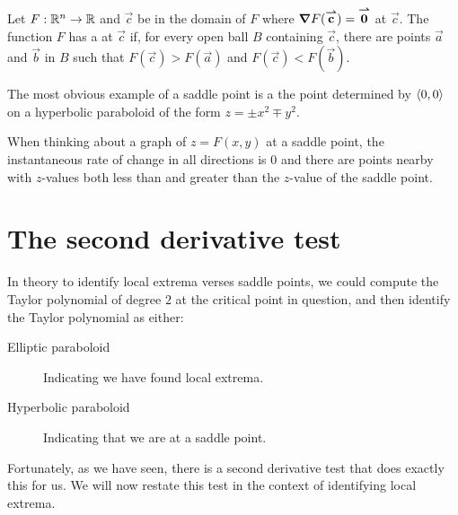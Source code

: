 \documentclass{ximera}
\begin{document}
\begin{definition}
  Let $F:\mathbb R^n\to\mathbb R$ and $\vec{c}$ be in the domain of $F$ where $\boldsymbol\nabla
  F({\overset{\boldsymbol{\rightharpoonup}}{\mathbf{c}}}\hspace{0in})={\overset{\boldsymbol{\rightharpoonup}}{\mathbf{0}}}\hspace{0in}$ at $\vec{c}$. The function $F$ has a   at $\vec{c}$ 
   if, for every open ball $B$ containing
  $\vec{c}$, there are points $\vec{a}$ and $\vec{b}$ in $B$ such
  that $F(\vec{c})>F(\vec{a})$ and $F(\vec{c})<F(\vec{b})$.
\end{definition}

The most obvious example of a saddle point is a the point determined
by $\left\langle 0,0\right\rangle$ on a hyperbolic paraboloid of the form $z = \pm x^2 \mp y^2$. 
\begin{image}
\end{image}

When thinking about a graph of $z= F(x,y)$ at a saddle point, the
instantaneous rate of change in all directions is $0$ and there are
points nearby with $z$-values both less than and greater than the
$z$-value of the saddle point.



\section{The second derivative test}

In theory to identify local extrema verses saddle points, we could
compute the Taylor polynomial of degree $2$ at the critical point in
question, and then identify the Taylor polynomial as either:
\begin{description}
\item[Elliptic paraboloid] Indicating we have found local extrema.
\item[Hyperbolic paraboloid] Indicating that we are at a saddle point.
\end{description}
Fortunately, as we have seen, there is a second derivative test that
does exactly this for us. We will now restate this test in the context
of identifying local extrema.
\end{document}

